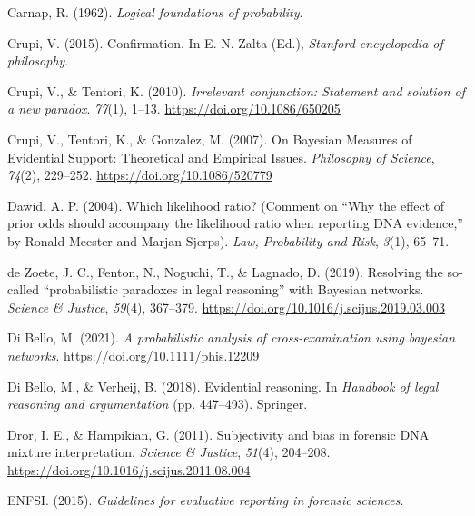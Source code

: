 \documentclass[
  letterpaper,
  DIV=11,
  numbers=noendperiod]{scrartcl}
\newlength{\cslhangindent}
\newlength{\cslentryspacingunit} %
\newenvironment{CSLReferences}[2] %
 {%
  \setlength{\parindent}{0pt}
  \ifodd #1
  \let\oldpar\par
  \def\par{\hangindent=\cslhangindent\oldpar}
  \fi
  \setlength{\parskip}{#2\cslentryspacingunit}
 }%
 {}
\begin{document}
\begin{CSLReferences}{1}{0}
\leavevmode{}%
Carnap, R. (1962). \emph{Logical foundations of probability}.

\leavevmode{}%
Crupi, V. (2015). Confirmation. In E. N. Zalta (Ed.), \emph{Stanford
encyclopedia of philosophy}.

\leavevmode{}%
Crupi, V., \& Tentori, K. (2010). \emph{Irrelevant conjunction:
Statement and solution of a new paradox}. \emph{77}(1), 1--13.
\url{https://doi.org/10.1086/650205}

\leavevmode{}%
Crupi, V., Tentori, K., \& Gonzalez, M. (2007). On {Bayesian Measures}
of {Evidential Support}: {Theoretical} and {Empirical Issues}.
\emph{Philosophy of Science}, \emph{74}(2), 229--252.
\url{https://doi.org/10.1086/520779}

\leavevmode{}%
Dawid, A. P. (2004). Which likelihood ratio? (Comment on {``{W}hy the
effect of prior odds should accompany the likelihood ratio when
reporting {DNA} evidence,''} by {R}onald {M}eester and {M}arjan
{S}jerps). \emph{Law, Probability and Risk}, \emph{3}(1), 65--71.

\leavevmode{}%
de Zoete, J. C., Fenton, N., Noguchi, T., \& Lagnado, D. (2019).
Resolving the so-called {``probabilistic paradoxes in legal reasoning''}
with {Bayesian} networks. \emph{Science \& Justice}, \emph{59}(4),
367--379. \url{https://doi.org/10.1016/j.scijus.2019.03.003}

\leavevmode{}%
Di Bello, M. (2021). \emph{A probabilistic analysis of cross-examination
using bayesian networks}. \url{https://doi.org/10.1111/phis.12209}

\leavevmode{}%
Di Bello, M., \& Verheij, B. (2018). Evidential reasoning. In
\emph{Handbook of legal reasoning and argumentation} (pp. 447--493).
Springer.

\leavevmode{}%
Dror, I. E., \& Hampikian, G. (2011). Subjectivity and bias in forensic
{DNA} mixture interpretation. \emph{Science {\&} Justice}, \emph{51}(4),
204--208. \url{https://doi.org/10.1016/j.scijus.2011.08.004}

\leavevmode{}%
ENFSI. (2015). \emph{Guidelines for evaluative reporting in forensic
sciences}.


\end{CSLReferences}
\end{document}
